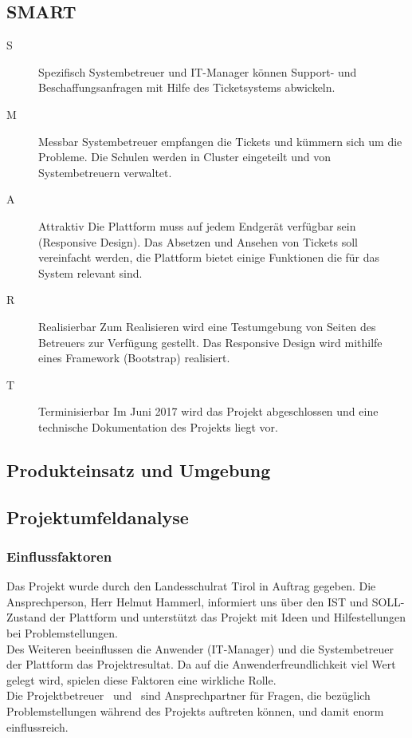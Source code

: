 
\subsection{SMART}
\begin{description}
	\item[S] Spezifisch\newline
	Systembetreuer und IT-Manager können Support- und Beschaffungsanfragen mit Hilfe des Ticketsystems abwickeln.
	\item[M] Messbar\newline
	Systembetreuer empfangen die Tickets und kümmern sich um die Probleme. Die Schulen werden in Cluster eingeteilt und von Systembetreuern verwaltet. 
	\item[A] Attraktiv\newline
	Die Plattform muss auf jedem Endgerät verfügbar sein (Responsive Design). Das Absetzen und Ansehen von Tickets soll vereinfacht werden, die Plattform bietet einige Funktionen die für das System relevant sind.
	\item[R] Realisierbar\newline
	Zum Realisieren wird eine Testumgebung von Seiten des Betreuers zur Verfügung gestellt. Das Responsive Design wird mithilfe eines Framework (Bootstrap) realisiert.
	\item[T] Terminisierbar\newline
	Im Juni 2017 wird das Projekt abgeschlossen und eine technische Dokumentation des Projekts liegt vor.
\end{description}


\subsection{Produkteinsatz und Umgebung}
\subsection{Projektumfeldanalyse}
\subsubsection{Einflussfaktoren}
Das Projekt wurde durch den Landesschulrat Tirol in Auftrag gegeben. Die Ansprechperson, Herr Helmut Hammerl, informiert uns über den IST und SOLL-Zustand der Plattform und unterstützt das Projekt mit Ideen und Hilfestellungen bei Problemstellungen.
\\
Des Weiteren beeinflussen die Anwender (IT-Manager) und die Systembetreuer der Plattform das Projektresultat. Da auf die Anwenderfreundlichkeit viel Wert gelegt wird, spielen diese Faktoren eine wirkliche Rolle.
\\
Die Projektbetreuer \getSteff\ und \getAlex\ sind Ansprechpartner für Fragen, die bezüglich Problemstellungen während des Projekts auftreten können, und damit enorm einflussreich.

